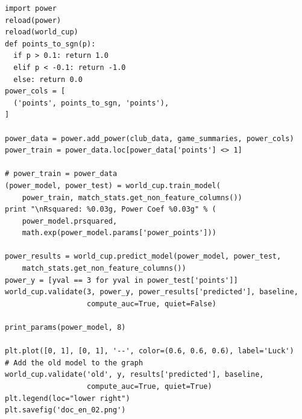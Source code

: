 \documentclass[12pt,fleqn]{article}\usepackage{common}
\begin{document}
\begin{verbatim}
import power
reload(power)
reload(world_cup)
def points_to_sgn(p):
  if p > 0.1: return 1.0
  elif p < -0.1: return -1.0
  else: return 0.0
power_cols = [
  ('points', points_to_sgn, 'points'),
]

power_data = power.add_power(club_data, game_summaries, power_cols)
power_train = power_data.loc[power_data['points'] <> 1] 

# power_train = power_data
(power_model, power_test) = world_cup.train_model(
    power_train, match_stats.get_non_feature_columns())
print "\nRsquared: %0.03g, Power Coef %0.03g" % (
    power_model.prsquared, 
    math.exp(power_model.params['power_points']))

power_results = world_cup.predict_model(power_model, power_test, 
    match_stats.get_non_feature_columns())
power_y = [yval == 3 for yval in power_test['points']]
world_cup.validate(3, power_y, power_results['predicted'], baseline, 
                   compute_auc=True, quiet=False)

print_params(power_model, 8)

plt.plot([0, 1], [0, 1], '--', color=(0.6, 0.6, 0.6), label='Luck')
# Add the old model to the graph
world_cup.validate('old', y, results['predicted'], baseline, 
                   compute_auc=True, quiet=True)
plt.legend(loc="lower right")
plt.savefig('doc_en_02.png')
\end{verbatim}
\end{document}
